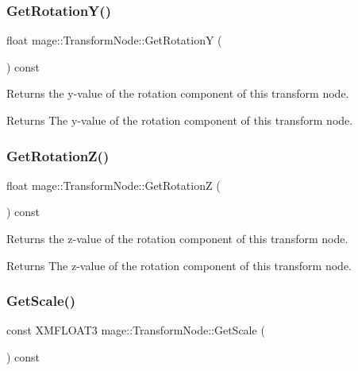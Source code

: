 \subsubsection{\texorpdfstring{Get\+Rotation\+Y()}{GetRotationY()}}
{\footnotesize\ttfamily float mage\+::\+Transform\+Node\+::\+Get\+RotationY (\begin{DoxyParamCaption}{ }\end{DoxyParamCaption}) const}

Returns the y-\/value of the rotation component of this transform node.

\begin{DoxyReturn}{Returns}
The y-\/value of the rotation component of this transform node. 
\end{DoxyReturn}
\hypertarget{classmage_1_1_transform_node_a7cbb269851eb512b19d3b1c0004d7148}{}\label{classmage_1_1_transform_node_a7cbb269851eb512b19d3b1c0004d7148} 
\subsubsection{\texorpdfstring{Get\+Rotation\+Z()}{GetRotationZ()}}
{\footnotesize\ttfamily float mage\+::\+Transform\+Node\+::\+Get\+RotationZ (\begin{DoxyParamCaption}{ }\end{DoxyParamCaption}) const}

Returns the z-\/value of the rotation component of this transform node.

\begin{DoxyReturn}{Returns}
The z-\/value of the rotation component of this transform node. 
\end{DoxyReturn}
\hypertarget{classmage_1_1_transform_node_acb0846fdaf70a8a88c4fe316032b5a0c}{}\label{classmage_1_1_transform_node_acb0846fdaf70a8a88c4fe316032b5a0c} 
\subsubsection{\texorpdfstring{Get\+Scale()}{GetScale()}}
{\footnotesize\ttfamily const X\+M\+F\+L\+O\+A\+T3 mage\+::\+Transform\+Node\+::\+Get\+Scale (\begin{DoxyParamCaption}{ }\end{DoxyParamCaption}) const}

